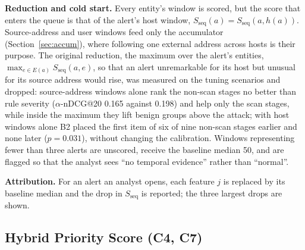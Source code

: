 \documentclass[conference]{IEEEtran}
\begin{document}
\textbf{Reduction and cold start.} Every entity's window is scored, but the score that enters the queue is that of the alert's host window, $S_\mathrm{seq}(a) = S_\mathrm{seq}(a, h(a))$. Source-address and user windows feed only the accumulator (Section~\ref{sec:accum}), where following one external address across hosts is their purpose. The original reduction, the maximum over the alert's entities, $\max_{e \in E(a)} S_\mathrm{seq}(a,e)$, so that an alert unremarkable for its host but unusual for its source address would rise, was measured on the tuning scenarios and dropped: source-address windows alone rank the non-scan stages no better than rule severity ($\alpha$-nDCG@20 0.165 against 0.198) and help only the scan stages, while inside the maximum they lift benign groups above the attack; with host windows alone B2 placed the first item of six of nine non-scan stages earlier and none later ($p = 0.031$), without changing the calibration. Windows representing fewer than three alerts are unscored, receive the baseline median 50, and are flagged so that the analyst sees ``no temporal evidence'' rather than ``normal''.

\textbf{Attribution.} For an alert an analyst opens, each feature $j$ is replaced by its baseline median and the drop in $S_\mathrm{seq}$ is reported; the three largest drops are shown.

\subsection{Hybrid Priority Score (C4, C7)}
\label{sec:hybrid}
\end{document}
